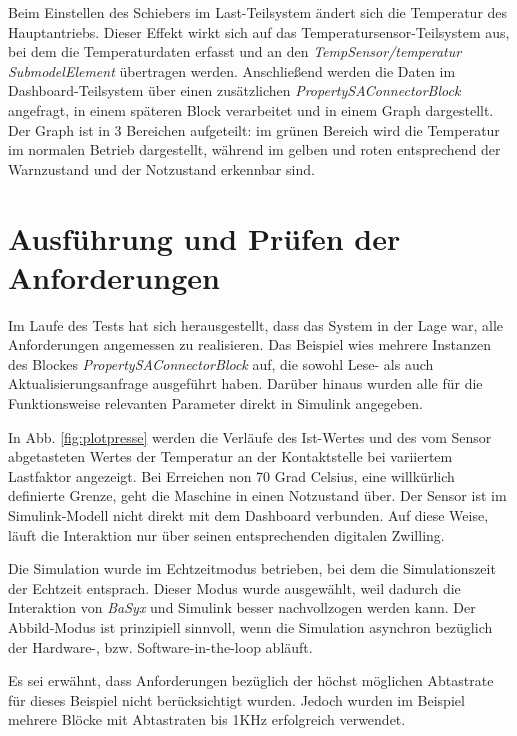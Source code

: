 Beim Einstellen des Schiebers im Last-Teilsystem ändert sich die Temperatur des Hauptantriebs. Dieser Effekt wirkt sich auf das Temperatursensor-Teilsystem aus, bei dem die Temperaturdaten erfasst und an den \textit{TempSensor/temperatur SubmodelElement} übertragen werden. Anschließend werden die Daten im Dashboard-Teilsystem über einen zusätzlichen \textit{PropertySAConnectorBlock} angefragt, in einem späteren Block verarbeitet und in einem Graph dargestellt. Der Graph ist in 3 Bereichen aufgeteilt: im grünen Bereich wird die Temperatur im normalen Betrieb dargestellt, während im gelben und roten entsprechend der Warnzustand und der Notzustand erkennbar sind. 


\section{Ausführung und Prüfen der Anforderungen}

Im Laufe des Tests hat sich herausgestellt, dass das System in der Lage war, alle Anforderungen angemessen zu realisieren. Das Beispiel wies mehrere Instanzen des Blockes \textit{PropertySAConnectorBlock} auf, die sowohl Lese- als auch Aktualisierungsanfrage ausgeführt haben. Darüber hinaus wurden alle für die Funktionsweise relevanten Parameter direkt in Simulink angegeben.

In Abb. \ref{fig:plotpresse} werden die Verläufe des Ist-Wertes und des vom Sensor abgetasteten Wertes der Temperatur an der Kontaktstelle bei variiertem Lastfaktor angezeigt. Bei Erreichen non 70 Grad Celsius, eine willkürlich definierte Grenze, geht die Maschine in einen Notzustand über. Der Sensor ist im Simulink-Modell nicht direkt mit dem Dashboard verbunden. Auf diese Weise, läuft die Interaktion nur über seinen entsprechenden digitalen Zwilling.






Die Simulation wurde im Echtzeitmodus betrieben, bei dem die Simulationszeit der Echtzeit entsprach. Dieser Modus wurde ausgewählt, weil dadurch die Interaktion von \textit{BaSyx} und Simulink besser nachvollzogen werden kann. Der Abbild-Modus ist prinzipiell sinnvoll, wenn die Simulation asynchron bezüglich der Hardware-, bzw. Software-in-the-loop abläuft.   

Es sei erwähnt, dass Anforderungen bezüglich der höchst möglichen Abtastrate für dieses Beispiel nicht berücksichtigt wurden. Jedoch wurden im Beispiel mehrere Blöcke mit Abtastraten bis 1KHz erfolgreich verwendet. 
